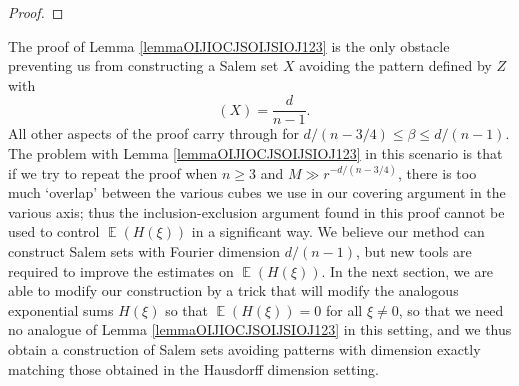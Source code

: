 \documentclass[dvipsnames,letterpaper,12pt]{article}
\numberwithin{equation}{section}
\DeclareMathOperator{\fordim}{\dim_{\mathbb{F}}}
\DeclareMathOperator{\ZZ}{\mathbb{Z}}
\DeclareMathOperator{\TT}{\mathbb{T}}
\numberwithin{theorem}{section}
\DeclareMathOperator{\EE}{\mathbb{E}}
\begin{document}
\begin{proof}
\end{proof}

The proof of Lemma \ref{lemmaOIJIOCJSOIJSIOJ123} is the only obstacle preventing us from constructing a Salem set $X$ avoiding the pattern defined by $Z$ with
%
\[ \fordim(X) = \frac{d}{n-1}. \]
%
All other aspects of the proof carry through for $d/(n-3/4) \leq \beta \leq d/(n-1)$. The problem with Lemma \ref{lemmaOIJIOCJSOIJSIOJ123} in this scenario is that if we try to repeat the proof when $n \geq 3$ and $M \gg r^{-d/(n-3/4)}$, there is too much `overlap' between the various cubes we use in our covering argument in the various axis; thus the inclusion-exclusion argument found in this proof cannot be used to control $\EE(H(\xi))$ in a significant way. We believe our method can construct Salem sets with Fourier dimension $d/(n-1)$, but new tools are required to improve the estimates on $\EE(H(\xi))$. In the next section, we are able to modify our construction by a trick that will modify the analogous exponential sums $H(\xi)$ so that $\EE(H(\xi)) = 0$ for all $\xi \neq 0$, so that we need no analogue of Lemma \ref{lemmaOIJIOCJSOIJSIOJ123} in this setting, and we thus obtain a construction of Salem sets avoiding patterns with dimension exactly matching those obtained in the Hausdorff dimension setting.
\end{document}

